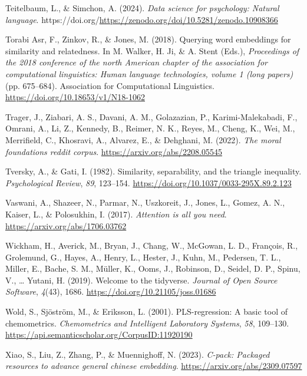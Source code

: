 \documentclass[
  man,
  floatsintext,
  longtable,
  nolmodern,
  notxfonts,
  notimes,
  colorlinks=true,linkcolor=blue,citecolor=blue,urlcolor=blue]{apa7}
\newlength{\cslhangindent}
\newenvironment{CSLReferences}[2] %
 {\begin{list}{}{%
  \setlength{\itemindent}{0pt}
  \setlength{\leftmargin}{0pt}
  \setlength{\parsep}{0pt}
  \ifodd #1
   \setlength{\leftmargin}{\cslhangindent}
   \setlength{\itemindent}{-1\cslhangindent}
  \fi
  \setlength{\itemsep}{#2\baselineskip}}}
 {\end{list}}
\begin{document}
\begin{CSLReferences}{1}{0}
Teitelbaum, L., \& Simchon, A. (2024). \emph{Data science for
psychology: Natural language}.
https://doi.org/\url{https://zenodo.org/doi/10.5281/zenodo.10908366}

Torabi Asr, F., Zinkov, R., \& Jones, M. (2018). Querying word
embeddings for similarity and relatedness. In M. Walker, H. Ji, \& A.
Stent (Eds.), \emph{Proceedings of the 2018 conference of the north
{A}merican chapter of the association for computational linguistics:
Human language technologies, volume 1 (long papers)} (pp. 675--684).
Association for Computational Linguistics.
\url{https://doi.org/10.18653/v1/N18-1062}

Trager, J., Ziabari, A. S., Davani, A. M., Golazazian, P.,
Karimi-Malekabadi, F., Omrani, A., Li, Z., Kennedy, B., Reimer, N. K.,
Reyes, M., Cheng, K., Wei, M., Merrifield, C., Khosravi, A., Alvarez,
E., \& Dehghani, M. (2022). \emph{The moral foundations reddit corpus}.
\url{https://arxiv.org/abs/2208.05545}

Tversky, A., \& Gati, I. (1982). Similarity, separability, and the
triangle inequality. \emph{Psychological Review}, \emph{89}, 123--154.
\url{https://doi.org/10.1037/0033-295X.89.2.123}

Vaswani, A., Shazeer, N., Parmar, N., Uszkoreit, J., Jones, L., Gomez,
A. N., Kaiser, L., \& Polosukhin, I. (2017). \emph{Attention is all you
need}. \url{https://arxiv.org/abs/1706.03762}

Wickham, H., Averick, M., Bryan, J., Chang, W., McGowan, L. D.,
François, R., Grolemund, G., Hayes, A., Henry, L., Hester, J., Kuhn, M.,
Pedersen, T. L., Miller, E., Bache, S. M., Müller, K., Ooms, J.,
Robinson, D., Seidel, D. P., Spinu, V., \ldots{} Yutani, H. (2019).
Welcome to the {tidyverse}. \emph{Journal of Open Source Software},
\emph{4}(43), 1686. \url{https://doi.org/10.21105/joss.01686}

Wold, S., Sjöström, M., \& Eriksson, L. (2001). PLS-regression: A basic
tool of chemometrics. \emph{Chemometrics and Intelligent Laboratory
Systems}, \emph{58}, 109--130.
\url{https://api.semanticscholar.org/CorpusID:11920190}

Xiao, S., Liu, Z., Zhang, P., \& Muennighoff, N. (2023). \emph{C-pack:
Packaged resources to advance general chinese embedding}.
\url{https://arxiv.org/abs/2309.07597}

\end{CSLReferences}
\end{document}
